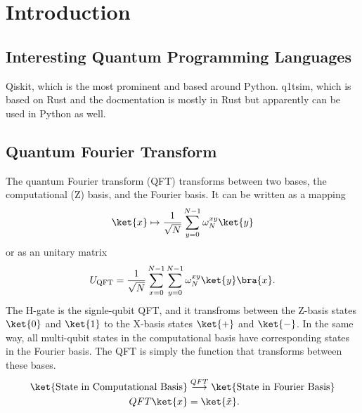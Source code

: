 \chapter{Introduction}
\section{Interesting Quantum Programming Languages}
Qiskit, which is the most prominent and based around Python.
q1tsim, which is based on Rust and the docmentation is mostly in Rust
but apparently can be used in Python as well.
\section{Quantum Fourier Transform}
The quantum Fourier transform (QFT) transforms between two bases, the
computational (Z) basis, and the Fourier basis. It can be written as a
mapping
\begin{equation}
  \label{eq:2}
  \ket{x} \mapsto \frac{1}{\sqrt{N}}\sum^{N-1}_{y=0}\omega^{xy}_{N}\ket{y}
\end{equation}
or as an unitary matrix
\begin{equation}
  \label{eq:3}
  U_{\text{QFT}}= \frac{1}{\sqrt{N}}\sum^{N-1}_{x=0}\sum^{N-1}_{y=0}\omega^{xy}_N\ket{y}\bra{x}.
\end{equation}
The H-gate is the
signle-qubit QFT, and it transfroms between the Z-basis states
$\ket{0}$ and $\ket{1}$ to the X-basis states $\ket{+}$ and
$\ket{-}$. In the same way, all multi-qubit states in the
computational basis have corresponding states in the Fourier
basis. The QFT is simply the function that transforms between these
bases.
\begin{align}
  \label{eq:1}
  \ket{\text{State in Computational Basis}}
  &\overset{QFT}{\longrightarrow} \ket{\text{State in Fourier
    Basis}}\\
  QFT\ket{x} &= \ket{\tilde{x}}.\\
\end{align}

